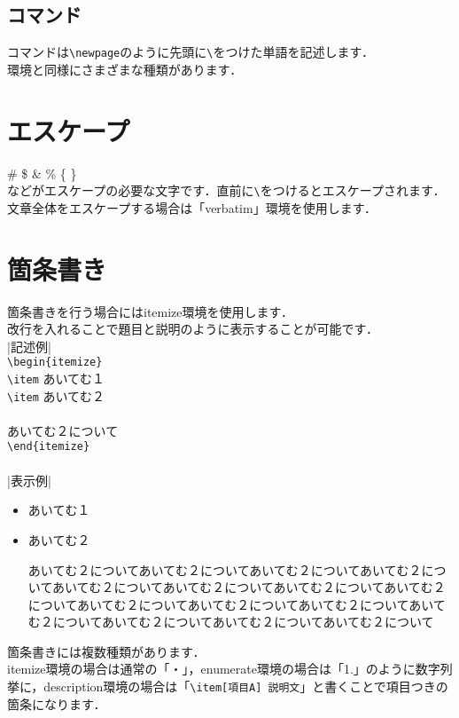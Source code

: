 \subsection{コマンド}
\label{sub:tex_basic_section_envcmd_cmd}
    コマンドは\verb|\newpage|のように先頭に\verb|\|をつけた単語を記述します．\\
    環境と同様にさまざまな種類があります．

\section{エスケープ}
\label{sec:tex_basic_escape}
    \# \$ \& \% \{ \}  \\
    などがエスケープの必要な文字です．直前に\verb|\|をつけるとエスケープされます．\\
    文章全体をエスケープする場合は「verbatim」環境を使用します．
     
\section{箇条書き}
\label{sec:tex_basic_clause}
    箇条書きを行う場合にはitemize環境を使用します．\\
    改行を入れることで題目と説明のように表示することが可能です．\\
    |記述例|\\
    \verb|\begin{itemize}|\\
        \verb|\item| あいてむ１\\
        \verb|\item| あいてむ２\\\\
        あいてむ２について\\
    \verb|\end{itemize}|\\\\
    |表示例|
\begin{itemize}
    \item あいてむ１
    \item あいてむ２

    あいてむ２についてあいてむ２についてあいてむ２についてあいてむ２についてあいてむ２についてあいてむ２についてあいてむ２についてあいてむ２についてあいてむ２についてあいてむ２についてあいてむ２についてあいてむ２についてあいてむ２についてあいてむ２についてあいてむ２について
\end{itemize} 

    箇条書きには複数種類があります．\\
    itemize環境の場合は通常の「・」，enumerate環境の場合は「1.」のように数字列挙に，description環境の場合は「\verb|\item[項目A] 説明文|」と書くことで項目つきの箇条になります．